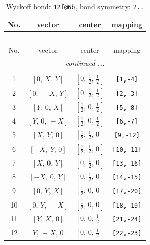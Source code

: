 \documentclass[fleqn,8pt]{jsarticle}
\begin{document}
\renewcommand{\arraystretch}{1.2}
\begin{longtable}{cccc}
\caption{Wyckoff bond: {\tt 12f@6b}, bond symmetry: {\tt 2..}}
 \\
 \hline \hline
No. & vector & center & mapping \\ \hline \endfirsthead

\multicolumn{3}{l}{\tablename\ \thetable{}} \\
 \hline \hline
No. & vector & center & mapping \\ \hline \endhead

 \hline \hline
\multicolumn{3}{r}{\footnotesize\it continued ...} \\ \endfoot

 \hline \hline
\multicolumn{3}{r}{} \\ \endlastfoot

1 & $\left[ 0,\, X,\, Y \right]$ & $\left[ 0,\, \frac{1}{2},\, \frac{1}{2} \right]$ & {\tt [1,-4]} \\ \hline
2 & $\left[ 0,\, - X,\, Y \right]$ & $\left[ 0,\, \frac{1}{2},\, \frac{1}{2} \right]$ & {\tt [2,-3]} \\ \hline
3 & $\left[ Y,\, 0,\, X \right]$ & $\left[ \frac{1}{2},\, 0,\, \frac{1}{2} \right]$ & {\tt [5,-8]} \\ \hline
4 & $\left[ Y,\, 0,\, - X \right]$ & $\left[ \frac{1}{2},\, 0,\, \frac{1}{2} \right]$ & {\tt [6,-7]} \\ \hline
5 & $\left[ X,\, Y,\, 0 \right]$ & $\left[ \frac{1}{2},\, \frac{1}{2},\, 0 \right]$ & {\tt [9,-12]} \\ \hline
6 & $\left[ - X,\, Y,\, 0 \right]$ & $\left[ \frac{1}{2},\, \frac{1}{2},\, 0 \right]$ & {\tt [10,-11]} \\ \hline
7 & $\left[ X,\, 0,\, Y \right]$ & $\left[ 0,\, \frac{1}{2},\, 0 \right]$ & {\tt [13,-16]} \\ \hline
8 & $\left[ - X,\, 0,\, Y \right]$ & $\left[ 0,\, \frac{1}{2},\, 0 \right]$ & {\tt [14,-15]} \\ \hline
9 & $\left[ 0,\, Y,\, X \right]$ & $\left[ \frac{1}{2},\, 0,\, 0 \right]$ & {\tt [17,-20]} \\ \hline
10 & $\left[ 0,\, Y,\, - X \right]$ & $\left[ \frac{1}{2},\, 0,\, 0 \right]$ & {\tt [18,-19]} \\ \hline
11 & $\left[ Y,\, X,\, 0 \right]$ & $\left[ 0,\, 0,\, \frac{1}{2} \right]$ & {\tt [21,-24]} \\ \hline
12 & $\left[ Y,\, - X,\, 0 \right]$ & $\left[ 0,\, 0,\, \frac{1}{2} \right]$ & {\tt [22,-23]} \\
\end{longtable}
\end{document}

